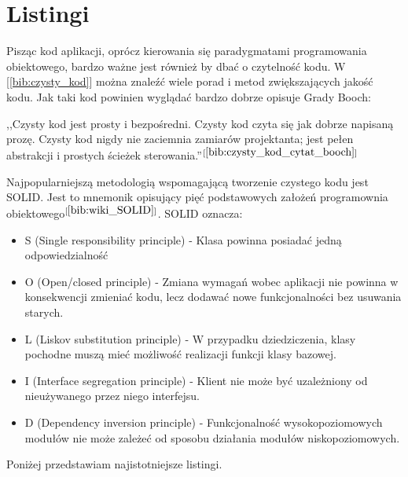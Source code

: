 \section{Listingi}
Pisząc kod aplikacji, oprócz kierowania się paradygmatami programowania obiektowego, bardzo ważne jest również by dbać o czytelność kodu. W [\ref{bib:czysty_kod}] można znaleźć wiele porad i metod zwiększających jakość kodu. Jak taki kod powinien wyglądać bardzo dobrze opisuje Grady Booch:
\begin{center}
	,,Czysty kod jest prosty i bezpośredni. Czysty kod czyta się jak dobrze napisaną prozę. Czysty kod nigdy nie zaciemnia zamiarów projektanta; jest pełen abstrakcji i prostych ścieżek sterowania.''$^{[\ref{bib:czysty_kod_cytat_booch}]}$
\end{center}
Najpopularniejszą metodologią wspomagającą tworzenie czystego kodu jest SOLID. Jest to mnemonik opisujący pięć podstawowych założeń programownia obiektowego$^{[\ref{bib:wiki_SOLID}]}$. SOLID oznacza:
\begin{itemize}
	\item S (Single responsibility principle) - Klasa powinna posiadać jedną odpowiedzialność
	\item O (Open/closed principle) - Zmiana wymagań wobec aplikacji nie powinna w konsekwencji zmieniać kodu, lecz dodawać nowe funkcjonalności bez usuwania starych.
	\item L (Liskov substitution principle) - W przypadku dziedziczenia, klasy pochodne muszą mieć możliwość realizacji funkcji klasy bazowej.
	\item I (Interface segregation principle) - Klient nie może być uzależniony od nieużywanego przez niego interfejsu.
	\item D (Dependency inversion principle) - Funkcjonalność wysokopoziomowych modułów nie może zależeć od sposobu działania modułów niskopoziomowych.
\end{itemize}

Poniżej przedstawiam najistotniejsze listingi.
